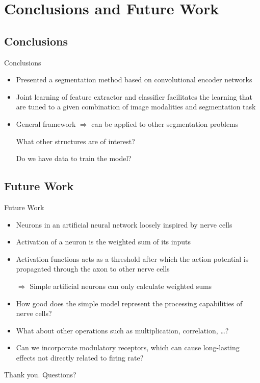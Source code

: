 \documentclass{beamer}
\begin{document}
\section{Conclusions and Future Work}

\subsection{Conclusions}

\begin{frame}{Conclusions}
\begin{itemize}
\item Presented a segmentation method based on convolutional encoder networks
\item Joint learning of feature extractor and classifier facilitates the
learning that are tuned to a given combination of image modalities and
segmentation task
\item General framework $\Rightarrow$ can be applied to other segmentation
problems
\end{itemize}

\begin{itemize}
\item[\faQuestionCircle] What other structures are of interest?
\item[\faQuestionCircle] Do we have data to train the model? 
\end{itemize}
\end{frame}

\subsection{Future Work}

\begin{frame}{Future Work}
\begin{itemize}
\item Neurons in an artificial neural network loosely inspired by nerve cells
\item Activation of a neuron is the weighted sum of its inputs
\item Activation functions acts as a threshold after which the action potential
is propagated through the axon to other nerve cells
\item[$\Rightarrow$] Simple artificial neurons can only calculate weighted sums
\end{itemize}

\begin{itemize}
\item<2->[\faQuestionCircle] How good does the simple model represent the
processing capabilities of nerve cells?
\item<2->[\faQuestionCircle] What about other operations such as
multiplication, correlation, \dots ?
\item<2->[\faQuestionCircle] Can we incorporate modulatory receptors, which can
cause long-lasting effects not directly related to firing rate?
\end{itemize}
\end{frame}

\begin{questionmarks}
\begin{frame}
\centering
Thank you. Questions?
\end{frame}
\end{questionmarks}
\end{document}
